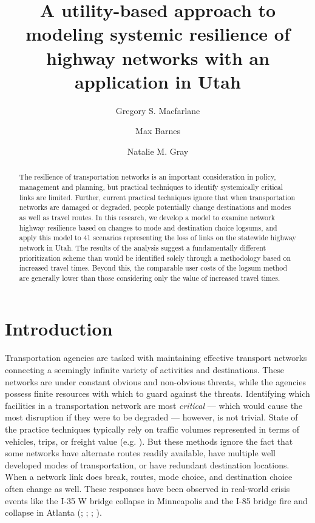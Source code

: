 \documentclass[]{ascelike-new}
\title{A utility-based approach to modeling systemic resilience of
highway networks with an application in Utah}
\author[1*]{Gregory S. Macfarlane}%
\affil[1*]{
	Brigham Young University, Civil and Construction Engineering
Department; 
	Email: gregmacfarlane@byu.edu
	; Corresponding author}
\author[2]{Max Barnes}%
\affil[2]{
	Kimley-Horn; 
	Email: maxbarnes@kha.com
	}
\author[3]{Natalie M. Gray}%
\affil[3]{
	WSP; 
	Email: nat.gray2000@gmail.com
	}
\begin{document}
\maketitle

\begin{abstract}
	The resilience of transportation networks is an important consideration
in policy, management and planning, but practical techniques to identify
systemically critical links are limited. Further, current practical
techniques ignore that when transportation networks are damaged or
degraded, people potentially change destinations and modes as well as
travel routes. In this research, we develop a model to examine network
highway resilience based on changes to mode and destination choice
logsums, and apply this model to 41 scenarios representing the loss of
links on the statewide highway network in Utah. The results of the
analysis suggest a fundamentally different prioritization scheme than
would be identified solely through a methodology based on increased
travel times. Beyond this, the comparable user costs of the logsum
method are generally lower than those considering only the value of
increased travel times.
\end{abstract}

\par
\vspace{1em}



\section{Introduction}\label{intro}

Transportation agencies are tasked with maintaining effective transport
networks connecting a seemingly infinite variety of activities and
destinations. These networks are under constant obvious and non-obvious
threats, while the agencies possess finite resources with which to guard
against the threats. Identifying which facilities in a transportation
network are most \emph{critical} --- which would cause the most
disruption if they were to be degraded --- however, is not trivial.
State of the practice techniques typically rely on traffic volumes
represented in terms of vehicles, trips, or freight value (e.g.
). But these methods ignore the fact
that some networks have alternate routes readily available, have
multiple well developed modes of transportation, or have redundant
destination locations. When a network link does break, routes, mode
choice, and destination choice often change as well. These responses
have been observed in real-world crisis events like the I-35 W bridge
collapse in Minneapolis and the I-85 bridge fire and collapse in Atlanta
(;
;
;
).
\end{document}
